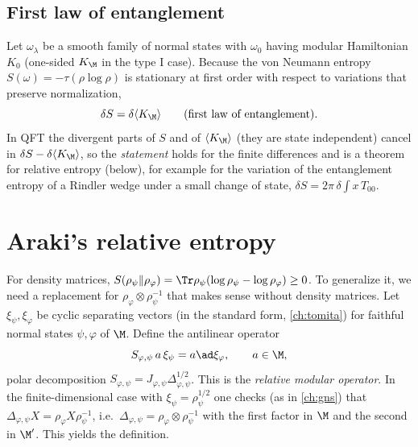 \subsection*{First law of entanglement}
Let $\omega_\lambda$ be a smooth family of normal states with $\omega_0$ having modular Hamiltonian $K_0$ (one-sided $K_\M$ in the type I case). Because the von Neumann entropy $S(\omega)=-\tau(\rho\log\rho)$ is stationary at first order with respect to variations that preserve normalization,
\begin{equation}
\delta S=\delta\langle K_\M\rangle\qquad\text{(first law of entanglement)}.
\end{equation}
In QFT the divergent parts of $S$ and of $\langle K_\M\rangle$ (they are state independent) cancel in $\delta S-\delta\langle K_\M\rangle$, so the \emph{statement} holds for the finite differences and is a theorem for relative entropy (below), for example for the variation of the entanglement entropy of a Rindler wedge under a small change of state, $\delta S=2\pi\,\delta\int x\,T_{00}$.

\section{Araki's relative entropy}

For density matrices, $S(\rho_\psi\|\rho_\varphi)=\Tr\rho_\psi(\log\rho_\psi-\log\rho_\varphi)\ge0$. To generalize it, we need a replacement for $\rho_\varphi\otimes\rho_\psi^{-1}$ that makes sense without density matrices. Let $\xi_\psi,\xi_\varphi$ be cyclic separating vectors (in the standard form, \cref{ch:tomita}) for faithful normal states $\psi,\varphi$ of $\M$. Define the antilinear operator
\begin{equation}
S_{\varphi,\psi}\,a\,\xi_\psi=a\ad\xi_\varphi,\qquad a\in\M,
\end{equation}
polar decomposition $S_{\varphi,\psi}=J_{\varphi,\psi}\Delta_{\varphi,\psi}^{1/2}$. This is the \emph{relative modular operator}. In the finite-dimensional case with $\xi_\psi=\rho_\psi^{1/2}$ one checks (as in \cref{ch:gns}) that $\Delta_{\varphi,\psi}X=\rho_\varphi X\rho_\psi^{-1}$, i.e.\ $\Delta_{\varphi,\psi}=\rho_\varphi\otimes\rho_\psi^{-1}$ with the first factor in $\M$ and the second in $\M'$. This yields the definition.

